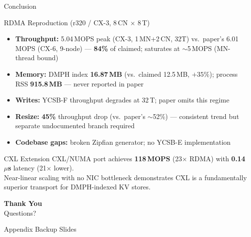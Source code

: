 \documentclass[aspectratio=169]{beamer}
\begin{document}
\begin{frame}{Conclusion}
\begin{block}{RDMA Reproduction (r320 / CX-3, 8\,CN $\times$ 8\,T)}
\begin{itemize}\setlength{\itemsep}{1pt}
  \item \textbf{Throughput:} 5.04\,MOPS peak (CX-3, 1\,MN+2\,CN, 32T) vs.\ paper's 6.01\,MOPS (CX-6, 9-node) — \textbf{84\%} of claimed; saturates at $\sim$5\,MOPS (MN-thread bound)
  \item \textbf{Memory:} DMPH index \textbf{16.87\,MB} (vs.\ claimed 12.5\,MB, $+35\%$); process RSS \textbf{915.8\,MB} — never reported in paper
  \item \textbf{Writes:} YCSB-F throughput degrades at 32\,T; paper omits this regime
  \item \textbf{Resize:} \textbf{45\%} throughput drop (vs.\ paper's $\sim$52\%) — consistent trend but separate undocumented branch required
  \item \textbf{Codebase gaps:} broken Zipfian generator; no YCSB-E implementation
\end{itemize}
\end{block}

\begin{block}{CXL Extension}
CXL/NUMA port achieves \textbf{118\,MOPS} (23$\times$ RDMA) with \textbf{0.14\,$\mu$s} latency (21$\times$ lower).\\
Near-linear scaling with no NIC bottleneck demonstrates CXL is a fundamentally\\
superior transport for DMPH-indexed KV stores.
\end{block}
\end{frame}

\begin{frame}{}
\centering
\vfill
{\Huge\textbf{Thank You}}\\[12pt]
{\Large Questions?}
\vfill
\end{frame}

\appendix
\begin{frame}{Appendix}
\centering
{\Large Backup Slides}
\end{frame}
\end{document}
